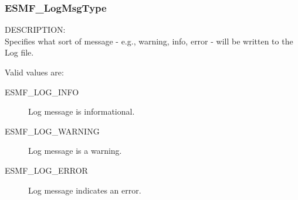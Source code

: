 
\subsubsection{ESMF\_LogMsgType}

\label{opt:logmsgtype}
{\sf DESCRIPTION:\\}
Specifies what sort of message - e.g., warning, info,
error - will be written to the Log file.

Valid values are:
\begin{description}
   \item [ESMF\_LOG\_INFO] 
         Log message is informational.
   \item [ESMF\_LOG\_WARNING]
         Log message is a warning.
   \item [ESMF\_LOG\_ERROR]
         Log message indicates an error.
\end{description}







